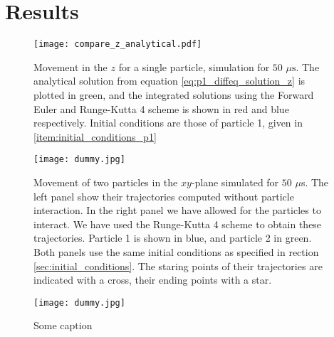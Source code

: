 \section{Results}\label{sec:results}



\begin{figure}[h!]
    \texttt{[image: compare\_z\_analytical.pdf]}
    \caption{Movement in the $z$ for a single particle, simulation for $50$ $\mu\mathrm{s}$. The analytical solution from equation \ref{eq:p1_diffeq_solution_z} is plotted in green, and the integrated solutions using the Forward Euler and Runge-Kutta 4 scheme is shown in red and blue respectively. Initial conditions are those of particle 1, given in \ref{item:initial_conditions_p1} }
    \label{fig:compare_z_analytical}
\end{figure}




\newpage
\onecolumngrid


\begin{figure}[h!]
    \texttt{[image: dummy.jpg]}
    \caption{Movement of two particles in the $xy$-plane simulated for $50$ $\mu$s. The left panel show their trajectories computed without particle interaction. In the right panel we have allowed for the particles to interact. We have used the Runge-Kutta 4 scheme to obtain these trajectories. Particle 1 is shown in blue, and particle 2 in green. Both panels use the same initial conditions as specified in rection \ref{sec:initial_conditions}. The staring points of their trajectories are indicated with a cross, their ending points with a star. }
    \label{fig:xy_two_particles}
\end{figure}

\begin{figure}[h!]
    \texttt{[image: dummy.jpg]}
    \caption{Some caption}
    \label{fig:some_ref}
\end{figure}

